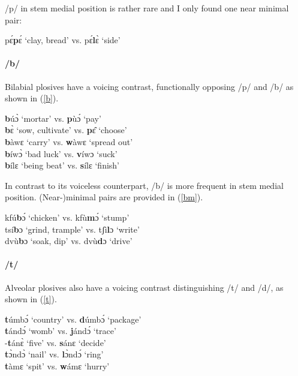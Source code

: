 \noindent /p/ in stem medial position is rather rare and I only found one near minimal pair:

\begin{exe} \ex \label{pm}
pɛ́{\bfseries p}ɛ́ `clay, bread' vs. pɛ́{\bfseries l}ɛ̀ `side' 
\end{exe}


\paragraph{\bfseries /b/} Bilabial plosives have a voicing contrast, functionally opposing /p/ and /b/ as shown in (\ref{b}).

\begin{exe} \ex \label{b}
{\bfseries b}úɔ̀ `mortar'   vs. {\bfseries p}ùɔ́ `pay' \\
{\bfseries b}ɛ̀  `sow, cultivate'  vs. {\bfseries p}ɛ̂ `choose' \\
{\bfseries b}àwɛ `carry' vs. {\bfseries w}àwɛ `spread out' \\
{\bfseries b}íwɔ̀ `bad luck' vs. {\bfseries v}íwɔ `suck' \\
{\bfseries b}ílɛ `being beat' vs. {\bfseries s}ílɛ `finish'
\end{exe}

\noindent In contrast to its voiceless counterpart, /b/ is more frequent in stem medial position. (Near-)minimal pairs are provided in (\ref{bm}).

\begin{exe} \ex \label{bm}
kfú{\bfseries b}ɔ́ `chicken' vs. kfù{\bfseries m}ɔ́ `stump' \\
tsí{\bfseries b}ɔ `grind, trample' vs. tʃì{\bfseries l}ɔ `write' \\
dvù{\bfseries b}ɔ `soak, dip' vs. dvù{\bfseries d}ɔ `drive'
\end{exe}

\paragraph{\bfseries /t/} Alveolar plosives also have a voicing contrast distinguishing /t/ and /d/, as shown in (\ref{t}).

\begin{exe} \ex \label{t}
{\bfseries t}úmbɔ́  `country'  vs. {\bfseries d}úmbɔ́ `package' \\
{\bfseries t}ándɔ́ `womb'  vs. {\bfseries j}ándɔ́ `trace' \\
-{\bfseries t}ánɛ̀ `five' vs. {\bfseries s}ánɛ `decide' \\
{\bfseries t}ɔ̀ndɔ̀ `nail' vs. {\bfseries l}ɔ̀ndɔ́ `ring' \\
{\bfseries t}àmɛ `spit' vs. {\bfseries w}ámɛ `hurry'
\end{exe}

